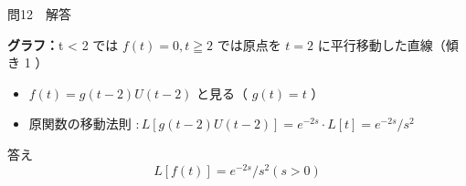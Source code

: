 \documentclass[aspectratio=43,professionalfonts,handout]{beamer}
\begin{document}
\begin{frame}{問12　解答}
  \begin{block}{}
  \textbf{グラフ：}t < 2 では $f(t)=0, t≧2$ では原点を $t=2$ に平行移動した直線（傾き 1 ）\\[0.3em]
  \begin{itemize}\setlength{\itemsep}{2pt}
    \item $f(t) = g(t-2)U(t-2)$ と見る（ $g(t) = t$ ）
    \item 原関数の移動法則 $: L[g(t-2)U(t-2)] = e^{-2s}\cdot L[t] = e^{-2s}/s^{2}$
  \end{itemize}
  \end{block}
  \begin{exampleblock}{答え}
    \[
    L[f(t)] = e^{-2s}/s^{2}  (s > 0)
  \]
  \end{exampleblock}
\end{frame}
\end{document}
